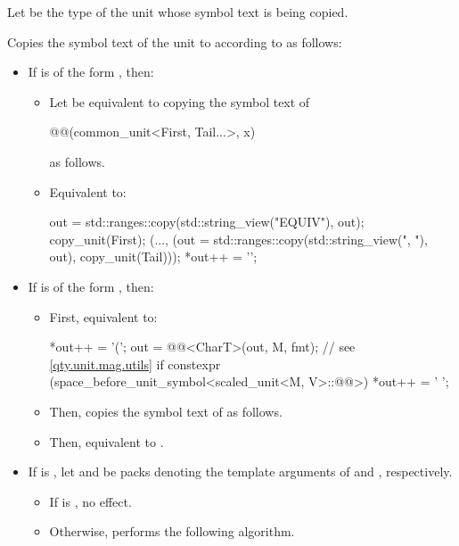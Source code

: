 \begin{itemdescr}
\pnum
Let  be the type of the unit whose symbol text is being copied.

\pnum
\effects
Copies the symbol text of the unit  to  according to  as follows:
\begin{itemize}
\item
If  is of the form , then:
\begin{itemize}
\item
Let  be equivalent to
copying the symbol text of
\begin{codeblock}
@@(common_unit<First, Tail...>{}, x)
\end{codeblock}
as follows.
\item
Equivalent to:
\begin{codeblock}
out = std::ranges::copy(std::string_view("EQUIV{"), out);
copy_unit(First{});
(...,
  (out = std::ranges::copy(std::string_view(", "), out), copy_unit(Tail{})));
*out++ = '}';
\end{codeblock}
\end{itemize}
\item
If  is of the form , then:
\begin{itemize}
\item
First, equivalent to:
\begin{codeblock}
*out++ = '(';
out = @@<CharT>(out, M, fmt);  // see \ref{qty.unit.mag.utils}
if constexpr (space_before_unit_symbol<scaled_unit<M, V>::@@>)
  *out++ = ' ';
\end{codeblock}
\item
Then, copies the symbol text of  as follows.
\item
Then, equivalent to .
\end{itemize}
\item
If
is ,
let  and 
be packs denoting the template arguments of
 and , respectively.
\begin{itemize}
\item
If  is ,
no effect.
\item
Otherwise, performs the following algorithm.

\end{itemize}
\end{itemize}
\end{itemdescr}
